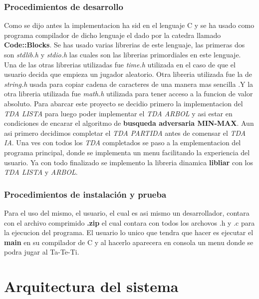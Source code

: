 \documentclass[12pt,twocolum,a4paper]{article}
\begin{document}
\subsubsection{Procedimientos de desarrollo}
\begin{frame}
    Como se dijo antes la implementacion ha sid en el lenguaje C y se ha usado como programa compilador de dicho lenguaje el dado por la catedra llamado {\bf Code::Blocks}. Se has usado varias librerias de este lenguaje, las primeras dos son {\itshape stdlib.h} y {\itshape stdio.h} las cuales son las librerias primordiales en este lenguaje. Una de las otras librerias utilizadas fue {\itshape time.h} utilizada en el caso de que el usuario decida que empieza un jugador aleatorio. Otra libreria utilizada fue la de {\itshape string.h} usada para copiar cadena de caracteres de una manera mas sencilla .Y la otra libreria utilizada fue {\itshape math.h} utilizada para tener acceso a la funcion de valor absoluto.
    \newline
    Para abarcar este proyecto se decidio primero la implementacion del {\itshape TDA LISTA} para luego poder implementar el {\itshape TDA ARBOL} y asi estar en condiciones de encarar el algoritmo de {\bf busqueda adversaria MIN-MAX}. Aun asi primero decidimos completar el {\itshape TDA PARTIDA} antes de comensar el {\itshape TDA IA}. 
    \newline
    Una ves con todos los {\itshape TDA} completados se paso a la emplementacion del programa principal, donde se implementa un menu facilitando la experiencia del usuario.
    \newline
    Ya con todo finalizado se implemento la libreria dinamica {\bf libliar} con los {\itshape TDA LISTA} y {\itshape ARBOL}.
\end{frame}

\subsubsection{Procedimientos de instalaci\'on y prueba}
\begin{frame}
    Para el uso del mismo, el usuario, el cual es asi mismo un desarrollador, contara con el archivo comprimido {\bf .zip} el cual contara con todos los archovos .h y .c para la ejecucion del programa. El usuario lo unico que tendra que hacer es ejecutar el {\bf main} en su compilador de C y al hacerlo aparecera en consola un menu donde se podra jugar al Ta-Te-Ti. 
\end{frame}

\section{Arquitectura del sistema}
\end{document}
